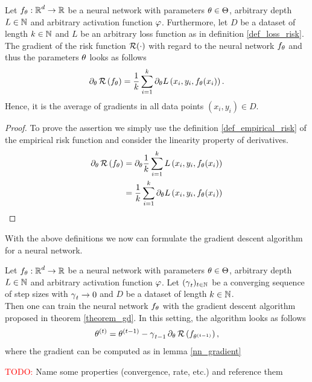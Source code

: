 \begin{lemma}\label{nn_gradient}
Let $f_\theta:\operatorname{\mathbb{R}}^d\to \operatorname{\mathbb{R}}$ be a neural network with parameters $\theta\in\operatorname{\Theta}$, arbitrary depth $L\in\operatorname{\mathbb{N}}$ and arbitrary activation function $\operatorname{\varphi}$. Furthermore, let $D$ be a dataset of length $k\in \operatorname{\mathbb{N}}$ and $L$ be an arbitrary loss function as in definition \ref{def_loss_risk}.\\
The gradient of the risk function $\operatorname{\mathcal{R}}(\cdot)$ with regard to the neural network $f_\theta$ and thus the parameters $\theta$ looks as follows
\begin{align*}
\partial_\theta \operatorname{\mathcal{R}} \left(f_{\theta}\right) = \frac{1}{k} \sum_{i=1}^{k} \partial_\theta L\left(x_i, y_i, f_\theta(x_i)\right).
\end{align*}
Hence, it is the average of gradients in all data points $(x_i,y_i) \in D$.
\end{lemma}


\begin{proof}
To prove the assertion we simply use the definition \ref{def_empirical_risk} of the empirical risk function and consider the linearity property of derivatives.
\begin{align*}
\partial_\theta \operatorname{\mathcal{R}} \left(f_{\theta}\right) &= \partial_\theta \frac{1}{k} \sum_{i=1}^{k} L\left(x_i, y_i, f_\theta(x_i)\right)\\
&= \frac{1}{k} \sum_{i=1}^{k} \partial_\theta L\left(x_i, y_i, f_\theta(x_i)\right)
\end{align*}
\end{proof}


With the above definitions we now can formulate the gradient descent algorithm for a neural network.


\begin{corollary}
Let $f_\theta:\operatorname{\mathbb{R}}^d\to \operatorname{\mathbb{R}}$ be a neural network with parameters $\theta\in\operatorname{\Theta}$, arbitrary depth $L\in\operatorname{\mathbb{N}}$ and arbitrary activation function $\operatorname{\varphi}$. Let $(\operatorname{\gamma}_t)_{t \in \operatorname{\mathbb{N}}}$ be a converging sequence of step sizes with $\operatorname{\gamma}_t \to 0$ and $D$ be a dataset of length $k\in \operatorname{\mathbb{N}}$.\\
Then one can train the neural network $f_\theta$ with the gradient descent algorithm proposed in theorem \ref{theorem_gd}. In this setting, the algorithm looks as follows
\begin{align*}
\theta^{(t)} = \theta^{(t - 1)} - \operatorname{\gamma}_{t-1} \partial_\theta \operatorname{\mathcal{R}} \left(f_{\theta^{(t -1)}}\right),
\end{align*}
where the gradient can be computed as in lemma \ref{nn_gradient}
\end{corollary}


\textcolor{red}{TODO:} Name some properties (convergence, rate, etc.) and reference them


